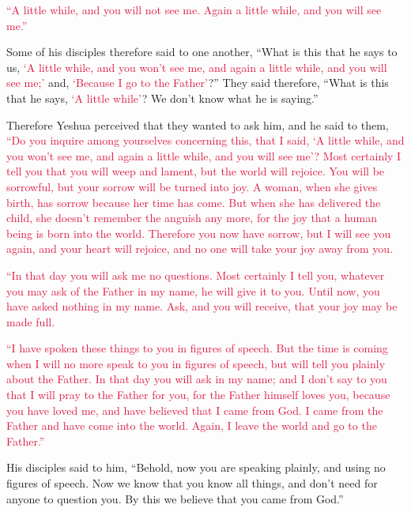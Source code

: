 \myverse{}\textcolor{crimson}{“A little while, and you will not see me. Again a little
	while, and you will see me.”}

\myverse{}Some of his disciples therefore said to one another, “What is
this that he says to us,
\textcolor{crimson}{‘A little while, and you won’t see me, and again a little while, and you will see me;’} and,
\textcolor{crimson}{‘Because I go to the Father’}?”
\myverse{}They said therefore, “What is this that he says,
\textcolor{crimson}{‘A little while’}? We don’t know what he is saying.”

\myverse{}Therefore Yeshua perceived that they wanted to ask him, and
he said to them,
\textcolor{crimson}{“Do you inquire among yourselves concerning this, that I said, ‘A little while, and you won’t see
	me, and again a little while, and you will see me’?
}
\myverse{}\textcolor{crimson}{Most certainly I tell you that you will weep and lament, but the world
	will rejoice. You will be sorrowful, but your sorrow will be turned into joy.
}
\myverse{}\textcolor{crimson}{A woman, when she gives birth, has sorrow because her time has come.
	But when she has delivered the child, she doesn’t remember the anguish any more, for the joy that a human
	being is born into the world.
}
\myverse{}\textcolor{crimson}{Therefore you now have sorrow, but I will see you again, and your heart
	will rejoice, and no one will take your joy away from you.}

\myverse{}\textcolor{crimson}{“In that day you will ask me no questions. Most certainly
	I tell you, whatever you may ask of the Father in my name, he will give it to you.
}
\myverse{}\textcolor{crimson}{Until now, you have asked nothing in my name. Ask, and you will receive,
	that your joy may be made full.
}

\myverse{}\textcolor{crimson}{“I have spoken these things to you in figures of speech.
	But the time is coming when I will no more speak to you in figures of speech, but will tell you plainly
	about the Father.
}
\myverse{}\textcolor{crimson}{In that day you will ask in my name; and I don’t say to you that I will
	pray to the Father for you,
}
\myverse{}\textcolor{crimson}{for the Father himself loves you, because you have loved me, and have
	believed that I came from God.
}
\myverse{}\textcolor{crimson}{I came from the Father and have come into the world. Again, I leave the
	world and go to the Father.”}

\myverse{}His disciples said to him, “Behold, now you are speaking plainly,
and using no figures of speech.
\myverse{}Now we know that you know all things, and don’t need for anyone to question
you. By this we believe that you came from God.”

